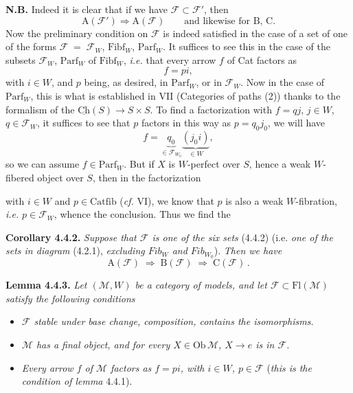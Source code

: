 \documentclass[11pt]{article}
\newcommand{\msp}[1]{\marginpar{\footnotesize [#1]}}
\newcommand{\cF}{\mathcal{F}}
\newcommand{\cM}{\mathcal{M}}
\newcommand{\Fibf}{\mathrm{Fibf}}
\newcommand{\Parf}{\mathrm{Parf}}
\newcommand{\Fl}{\mathrm{Fl}}
\newcommand{\Catfib}{\mathrm{Catfib}}
\begin{document}
\textbf{N.B.} Indeed it is clear that if we have $\cF \subset \cF'$, then
\[
\mathrm{A}(\cF') \Longrightarrow \mathrm{A}(\cF) \qquad \text{and likewise for B, C.}
\tag*{$(*)$}
\]
Now the preliminary condition on $\cF$ is indeed satisfied in the case of a set of one of the forms $\cF \;=\; \cF_W$, $\Fibf_W$, $\Parf_W$. It suffices to see this in the case of the subsets $\cF_W$, $\Parf_W$ of $\Fibf_W$, \textit{i.e.} that every arrow $f$ of Cat factors as
\[
f = pi,
\]
with $i \in W$, and $p$ being, as desired, in $\Parf_W$, or in $\cF_W$. Now in the case of $\Parf_W$, \marginpar{$\|$}this is what is established in VII (Categories of paths (2)) thanks to the formalism of the $\underline{\mathrm{Ch}}(S) \longrightarrow S \times S$. To find a factorization with $f = qj$, $j \in W$, $q \in \cF_W$, it suffices to see that $p$ factors in this way as $p = q_0 j_0$, we will have %
\[
f = \underbrace{q_0}_{\in \cF_{W_0}} \underbrace{(j_0 i)}_{\in W},
\]
so we can assume $f \in \Parf_W$. But if $X$ is $W$-perfect over $S$, hence a
\msp{page 43}
weak $W$-fibered object over $S$, then in the factorization
\begin{center}
\end{center}
with $i \in W$ and $p \in \Catfib$ (\textit{cf.} VI), we know that $p$ is also a weak $W$-fibration, \textit{i.e.} $p \in \cF_W$, whence the conclusion. Thus we find the

\textbf{Corollary 4.4.2.} \textit{Suppose that $\cF$ is one of the six sets} (4.4.2) (i.e. \textit{one of the sets in diagram} (4.2.1), \textit{excluding $\mathit{Fib}_W$ and $\mathit{Fib}_{W_0}$}). \textit{Then we have}
\[
\mathrm{A}(\cF) \;\Longrightarrow\; \mathrm{B}(\cF) \;\Longrightarrow\; \mathrm{C}(\cF)\,.
\]

\textbf{Lemma 4.4.3.} \textit{Let $(\cM, W)$ be a category of models, and let $\cF \subset \Fl(\cM)$ satisfy the following conditions}
\begin{itemize}[leftmargin=3em]
\item[1)] \textit{$\cF$ stable under base change, composition, contains the isomorphisms.}
\item[2)] \textit{$\cM$ has a final object, and for every $X \in \mathrm{Ob}\,\cM$, $X \longrightarrow e$ is in $\cF$.}
\item[3)] \textit{Every arrow $f$ of $\cM$ factors as $f = pi$, with $i \in W$, $p \in \cF$} (\textit{this is the condition of lemma} 4.4.1).
\end{itemize}
\end{document}
